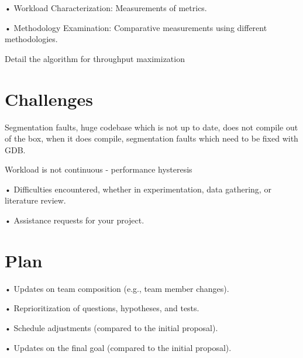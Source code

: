 \documentclass[12pt]{article}
\begin{document}
• Workload Characterization: Measurements of metrics.

• Methodology Examination: Comparative measurements using different methodologies.

\singlespacing
Detail the algorithm for throughput maximization

\section{Challenges}

Segmentation faults, huge codebase which is not up to date, does not compile out of the box, when it does compile, segmentation faults which need to be fixed with GDB.

Workload is not continuous - performance hysteresis

• Difficulties encountered, whether in experimentation, data gathering, or literature review.

• Assistance requests for your project.
\section{Plan}

• Updates on team composition (e.g., team member changes).

• Reprioritization of questions, hypotheses, and tests.

• Schedule adjustments (compared to the initial proposal).

• Updates on the final goal (compared to the initial proposal).


%
%
\end{document}
